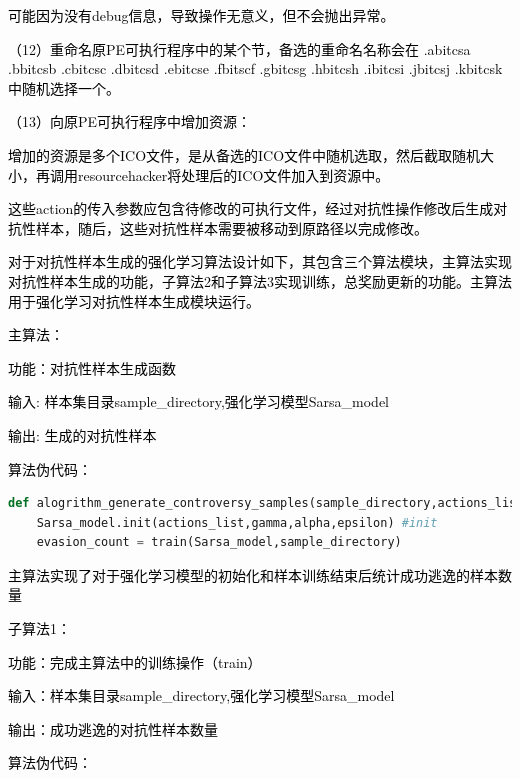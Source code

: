 \textcolor{black}{可能因为没有debug信息，导致操作无意义，但不会抛出异常。}

\textcolor{black}{（12）重命名原PE可执行程序中的某个节，备选的重命名名称会在
.abitcsa .bbitcsb .cbitcsc .dbitcsd .ebitcse .fbitscf .gbitcsg .hbitcsh .ibitcsi .jbitcsj .kbitcsk中随机选择一个。
}

\textcolor{black}{（13）向原PE可执行程序中增加资源：}

\textcolor{black}{增加的资源是多个ICO文件，是从备选的ICO文件中随机选取，然后截取随机大小，再调用resourcehacker将处理后的ICO文件加入到资源中。}

\textcolor{black}{这些action的传入参数应包含待修改的可执行文件，经过对抗性操作修改后生成对抗性样本，随后，这些对抗性样本需要被移动到原路径以完成修改。}

\textcolor{black}{对于对抗性样本生成的强化学习算法设计如下，其包含三个算法模块，主算法实现对抗性样本生成的功能，子算法2和子算法3实现训练，总奖励更新的功能。主算法用于强化学习对抗性样本生成模块运行。}

\textcolor{black}{主算法：}

\textcolor{black}{功能：对抗性样本生成函数}

\textcolor{black}{输入: 样本集目录sample\_directory,强化学习模型Sarsa\_model }

\textcolor{black}{输出: 生成的对抗性样本}

\textcolor{black}{算法伪代码：}

\begin{lstlisting}[language=Python, caption={code for main alogrithm}, label={lst:pythonfile1}]
def alogrithm_generate_controversy_samples(sample_directory,actions_list,Sarsa_model):  
	Sarsa_model.init(actions_list,gamma,alpha,epsilon) #init
	evasion_count = train(Sarsa_model,sample_directory)
\end{lstlisting}

\textcolor{black}{主算法实现了对于强化学习模型的初始化和样本训练结束后统计成功逃逸的样本数量}

\textcolor{black}{子算法1：}

\textcolor{black}{功能：完成主算法中的训练操作（train）}

\textcolor{black}{输入：样本集目录sample\_directory,强化学习模型Sarsa\_model}

\textcolor{black}{输出：成功逃逸的对抗性样本数量}

\textcolor{black}{算法伪代码：}

